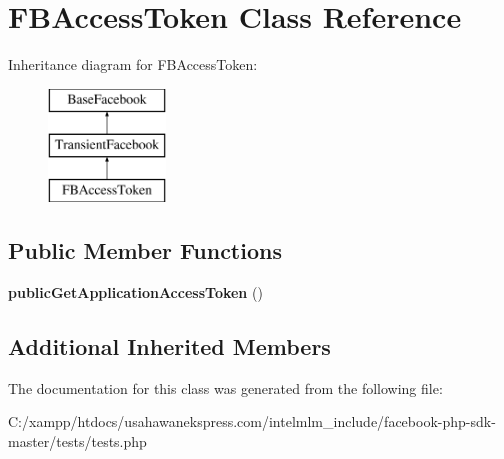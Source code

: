 \hypertarget{class_f_b_access_token}{\section{F\-B\-Access\-Token Class Reference}
\label{class_f_b_access_token}
}
Inheritance diagram for F\-B\-Access\-Token\-:\begin{figure}[H]
\begin{center}
\leavevmode
\includegraphics[height=3.000000cm]{class_f_b_access_token}
\end{center}
\end{figure}
\subsection*{Public Member Functions}
\begin{DoxyCompactItemize}
\item 
\hypertarget{class_f_b_access_token_a2294994b9187902515602a24bfc0b924}{{\bfseries public\-Get\-Application\-Access\-Token} ()}\label{class_f_b_access_token_a2294994b9187902515602a24bfc0b924}

\end{DoxyCompactItemize}
\subsection*{Additional Inherited Members}


The documentation for this class was generated from the following file\-:\begin{DoxyCompactItemize}
\item 
C\-:/xampp/htdocs/usahawanekspress.\-com/intelmlm\-\_\-include/facebook-\/php-\/sdk-\/master/tests/tests.\-php\end{DoxyCompactItemize}
